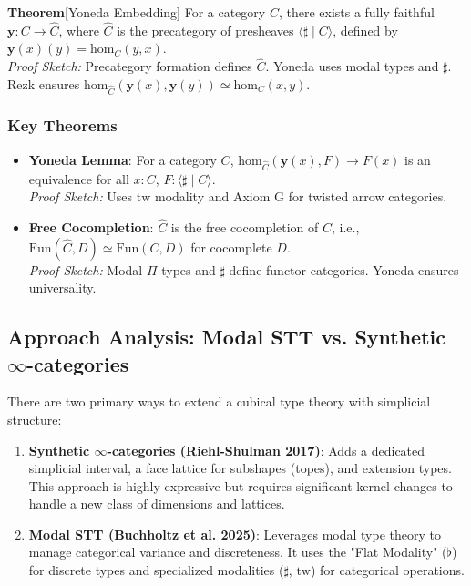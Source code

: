 \documentclass{article}
\begin{document}
\textbf{Theorem}[Yoneda Embedding]
For a category $C$, there exists a fully faithful $\mathbf{y} : C \to \widehat{C}$, where $\widehat{C}$ is the precategory of presheaves $\langle \sharp \mid C \rangle$, defined by $\mathbf{y}(x)(y) = \text{hom}_C(y,x)$. \\
\textit{Proof Sketch:} Precategory formation defines $\widehat{C}$. Yoneda uses modal types and $\sharp$. Rezk ensures $\text{hom}_{\widehat{C}}(\mathbf{y}(x), \mathbf{y}(y)) \simeq \text{hom}_C(x,y)$.

\subsubsection{Key Theorems}
\begin{itemize}
    \item \textbf{Yoneda Lemma}: For a category $C$, $\text{hom}_{\widehat{C}}(\mathbf{y}(x), F) \to F(x)$ is an equivalence for all $x : C$, $F : \langle \sharp \mid C \rangle$. \\
    \textit{Proof Sketch:} Uses $\text{tw}$ modality and Axiom G for twisted arrow categories.
    \item \textbf{Free Cocompletion}: $\widehat{C}$ is the free cocompletion of $C$, i.e., $\text{Fun}(\widehat{C}, D) \simeq \text{Fun}(C, D)$ for cocomplete $D$. \\
    \textit{Proof Sketch:} Modal $\Pi$-types and $\sharp$ define functor categories. Yoneda ensures universality.
\end{itemize}

\newpage
\subsection*{Approach Analysis: Modal STT vs. Synthetic $\infty$-categories}

There are two primary ways to extend a cubical type theory with simplicial structure:

\begin{enumerate}
    \item \textbf{Synthetic $\infty$-categories (Riehl-Shulman 2017)}: Adds a dedicated simplicial interval, a face lattice for subshapes (topes), and extension types. This approach is highly expressive but requires significant kernel changes to handle a new class of dimensions and lattices.
    \item \textbf{Modal STT (Buchholtz et al. 2025)}: Leverages modal type theory to manage categorical variance and discreteness. It uses the "Flat Modality" ($\flat$) for discrete types and specialized modalities ($\sharp$, $\text{tw}$) for categorical operations.
\end{enumerate}
\end{document}
